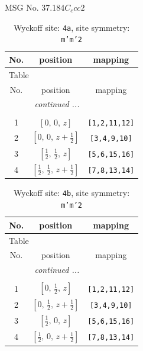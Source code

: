 \documentclass[fleqn,8pt]{jsarticle}
\begin{document}
\setcounter{MaxMatrixCols}{32}

\renewcommand{\tablename}{Table~}
\renewcommand{\figurename}{Figure~}
\begin{center}
\LARGE
MSG No. 37.184\quad$C_{c}cc2$
\end{center}
\renewcommand{\arraystretch}{1.2}
\begin{longtable}{ccc}
\caption{Wyckoff site: {\tt 4a}, site symmetry: {\tt m'm'2}}
 \\
 \hline \hline
No. & position & mapping \\ \hline \endfirsthead

\multicolumn{2}{l}{\tablename\ \thetable{}} \\
 \hline \hline
No. & position & mapping \\ \hline \endhead

 \hline \hline
\multicolumn{2}{r}{\footnotesize\it continued ...} \\ \endfoot

 \hline \hline
\multicolumn{2}{r}{} \\ \endlastfoot

1 & $\left[ 0,\, 0,\, z \right]$ & {\tt [1,2,11,12]} \\ \hline
2 & $\left[ 0,\, 0,\, z + \frac{1}{2} \right]$ & {\tt [3,4,9,10]} \\ \hline
3 & $\left[ \frac{1}{2},\, \frac{1}{2},\, z \right]$ & {\tt [5,6,15,16]} \\ \hline
4 & $\left[ \frac{1}{2},\, \frac{1}{2},\, z + \frac{1}{2} \right]$ & {\tt [7,8,13,14]} \\
\end{longtable}
\renewcommand{\arraystretch}{1.2}
\begin{longtable}{ccc}
\caption{Wyckoff site: {\tt 4b}, site symmetry: {\tt m'm'2}}
 \\
 \hline \hline
No. & position & mapping \\ \hline \endfirsthead

\multicolumn{2}{l}{\tablename\ \thetable{}} \\
 \hline \hline
No. & position & mapping \\ \hline \endhead

 \hline \hline
\multicolumn{2}{r}{\footnotesize\it continued ...} \\ \endfoot

 \hline \hline
\multicolumn{2}{r}{} \\ \endlastfoot

1 & $\left[ 0,\, \frac{1}{2},\, z \right]$ & {\tt [1,2,11,12]} \\ \hline
2 & $\left[ 0,\, \frac{1}{2},\, z + \frac{1}{2} \right]$ & {\tt [3,4,9,10]} \\ \hline
3 & $\left[ \frac{1}{2},\, 0,\, z \right]$ & {\tt [5,6,15,16]} \\ \hline
4 & $\left[ \frac{1}{2},\, 0,\, z + \frac{1}{2} \right]$ & {\tt [7,8,13,14]} \\
\end{longtable}
\end{document}
